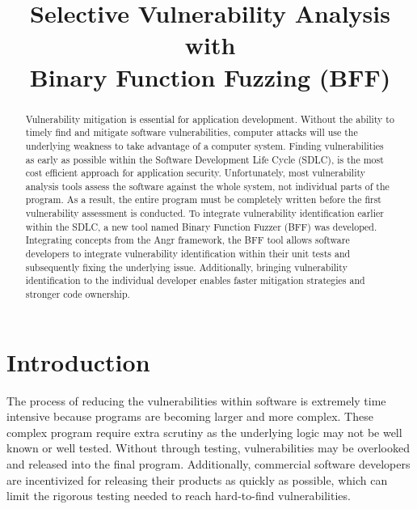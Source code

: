 \documentclass[conference]{IEEEtran}
\begin{document}
\title{Selective Vulnerability Analysis with\\
Binary Function Fuzzing (BFF)\\}

\author{
}

\maketitle

\begin{abstract}
Vulnerability mitigation is essential for application development. Without the ability to timely find and mitigate software vulnerabilities, computer attacks will use the underlying weakness to take advantage of a computer system. Finding vulnerabilities as early as possible within the Software Development Life Cycle (SDLC), is the most cost efficient approach for application security. Unfortunately, most vulnerability analysis tools assess the software against the whole system, not individual parts of the program. As a result, the entire program must be completely written before the first vulnerability assessment is conducted. To integrate vulnerability identification earlier within the SDLC, a new tool named Binary Function Fuzzer (BFF) was developed. Integrating concepts from the Angr \cite{shoshitaishvili_sok:_2016} framework, the BFF tool allows software developers to integrate vulnerability identification within their unit tests and subsequently fixing the underlying issue. Additionally, bringing vulnerability identification to the individual developer enables faster mitigation strategies and stronger code ownership. 
\end{abstract}

\IEEEpeerreviewmaketitle

\section{Introduction}
The process of reducing the vulnerabilities within software is extremely time intensive because programs are becoming larger and more complex. These complex program require extra scrutiny as the underlying logic may not be well known or well tested. Without through testing, vulnerabilities may be overlooked and released into the final program. Additionally, commercial software developers are incentivized for releasing their products as quickly as possible, which can limit the rigorous testing needed to reach hard-to-find vulnerabilities. 
\end{document}

